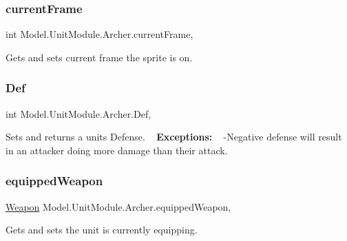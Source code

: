 \subsubsection{\texorpdfstring{current\+Frame}{currentFrame}}
{\footnotesize\ttfamily int Model.\+Unit\+Module.\+Archer.\+current\+Frame\hspace{0.3cm}{\ttfamily [get]}, {\ttfamily [set]}}

Gets and sets current frame the sprite is on. \hypertarget{class_model_1_1_unit_module_1_1_archer_a6b001252ea85b654e1c85fa47efd9d7b}{}\label{class_model_1_1_unit_module_1_1_archer_a6b001252ea85b654e1c85fa47efd9d7b} 
\subsubsection{\texorpdfstring{Def}{Def}}
{\footnotesize\ttfamily int Model.\+Unit\+Module.\+Archer.\+Def\hspace{0.3cm}{\ttfamily [get]}, {\ttfamily [set]}}

Sets and returns a unit\textquotesingle{}s Defense. ~\newline
 {\bfseries Exceptions\+:} ~\newline
 -\/\+Negative defense will result in an attacker doing more damage than their attack. \hypertarget{class_model_1_1_unit_module_1_1_archer_aff2e126518d4eb4e64a06ac44542fefe}{}\label{class_model_1_1_unit_module_1_1_archer_aff2e126518d4eb4e64a06ac44542fefe} 
\subsubsection{\texorpdfstring{equipped\+Weapon}{equippedWeapon}}
{\footnotesize\ttfamily \hyperlink{interface_model_1_1_weapon_module_1_1_weapon}{Weapon} Model.\+Unit\+Module.\+Archer.\+equipped\+Weapon\hspace{0.3cm}{\ttfamily [get]}, {\ttfamily [set]}}

Gets and sets the unit is currently equipping. \hypertarget{class_model_1_1_unit_module_1_1_archer_aa98508c9166b0d5661952efc2577e2f7}{}\label{class_model_1_1_unit_module_1_1_archer_aa98508c9166b0d5661952efc2577e2f7} 
